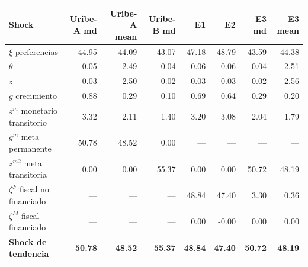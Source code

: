 \begin{tabular}{@{}lrrrrrrr@{}}
\toprule
Shock & Uribe-A md & Uribe-A mean & Uribe-B md & E1 & E2 & E3 md & E3 mean \\
\midrule
$\xi$ preferencias & 44.95 & 44.09 & 43.07 & 47.18 & 48.79 & 43.59 & 44.38 \\
$\theta$ & 0.05 & 2.49 & 0.04 & 0.06 & 0.06 & 0.04 & 2.51 \\
$z$ & 0.03 & 2.50 & 0.02 & 0.03 & 0.03 & 0.02 & 2.56 \\
$g$ crecimiento & 0.88 & 0.29 & 0.10 & 0.69 & 0.64 & 0.29 & 0.20 \\
$z^m$ monetario transitorio & 3.32 & 2.11 & 1.40 & 3.20 & 3.08 & 2.04 & 1.79 \\
$g^m$ meta permanente & 50.78 & 48.52 & 0.00 & --- & --- & --- & --- \\
$z^{m2}$ meta transitoria & 0.00 & 0.00 & 55.37 & 0.00 & 0.00 & 50.72 & 48.19 \\
$\zeta^F$ fiscal no financiado & --- & --- & --- & 48.84 & 47.40 & 3.30 & 0.36 \\
$\zeta^M$ fiscal financiado & --- & --- & --- & 0.00 & -0.00 & 0.00 & 0.00 \\
\midrule
\textbf{Shock de tendencia} & \textbf{50.78} & \textbf{48.52} & \textbf{55.37} & \textbf{48.84} & \textbf{47.40} & \textbf{50.72} & \textbf{48.19} \\
\bottomrule
\end{tabular}
